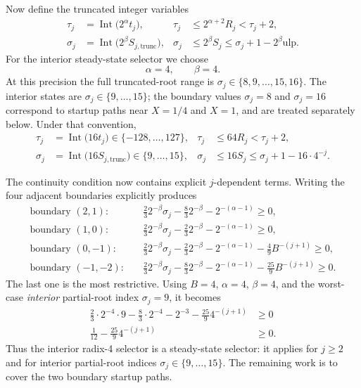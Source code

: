 \documentclass[11pt]{article}
\DeclareMathOperator{\Int}{Int}
\newcommand{\ulp}{\mathrm{ulp}}
\numberwithin{equation}{section}
\begin{document}
Now define the truncated integer variables
\begin{align}
  \label{eq:sqrt:radix4_tau_def}
  \tau_j &= \Int\bigl(2^{\alpha}t_j\bigr),
  &
  \tau_j &\le 2^{\alpha+2}R_j < \tau_j+2, \\
  \label{eq:sqrt:radix4_sigma_def}
  \sigma_j &= \Int\bigl(2^{\beta}S_{j,\text{trunc}}\bigr),
  &
  \sigma_j &\le 2^{\beta}S_j \le \sigma_j + 1 - 2^{\beta}\ulp.
\end{align}
For the interior steady-state selector we choose
\begin{equation}
  \label{eq:sqrt:radix4_alpha_beta_choice}
  \alpha = 4,
  \qquad
  \beta = 4.
\end{equation}
At this precision the full truncated-root range is $\sigma_j \in \{8,9,\dotsc,15,16\}$.
The interior states are $\sigma_j \in \{9,\dotsc,15\}$; the boundary values $\sigma_j=8$ and
$\sigma_j=16$ correspond to startup paths near $X=1/4$ and $X=1$, and are treated separately below.
Under that convention,
\begin{align}
  \label{eq:sqrt:radix4_tau_val}
  \tau_j &= \Int\bigl(16t_j\bigr) \in \{-128,\dotsc,127\},
  &
  \tau_j &\le 64R_j < \tau_j+2, \\
  \label{eq:sqrt:radix4_sigma_val}
  \sigma_j &= \Int\bigl(16S_{j,\text{trunc}}\bigr) \in \{9,\dotsc,15\},
  &
  \sigma_j &\le 16S_j \le \sigma_j + 1 - 16\cdot 4^{-j}.
\end{align}

The continuity condition now contains explicit $j$-dependent terms.
Writing the four adjacent boundaries explicitly produces
\begin{align}
  \text{boundary }(2,1):
  &\quad
  \frac{2}{3}2^{-\beta}\sigma_j - \frac{8}{3}2^{-\beta} - 2^{-(\alpha-1)} \ge 0,
  \label{eq:sqrt:radix4_cont_21} \\
  \text{boundary }(1,0):
  &\quad
  \frac{2}{3}2^{-\beta}\sigma_j - \frac{2}{3}2^{-\beta} - 2^{-(\alpha-1)} \ge 0,
  \label{eq:sqrt:radix4_cont_10} \\
  \text{boundary }(0,-1):
  &\quad
  \frac{2}{3}2^{-\beta}\sigma_j - \frac{2}{3}2^{-\beta} - 2^{-(\alpha-1)} - \frac{4}{9}B^{-(j+1)} \ge 0,
  \label{eq:sqrt:radix4_cont_0m1} \\
  \text{boundary }(-1,-2):
  &\quad
  \frac{2}{3}2^{-\beta}\sigma_j - \frac{8}{3}2^{-\beta} - 2^{-(\alpha-1)} - \frac{25}{9}B^{-(j+1)} \ge 0.
  \label{eq:sqrt:radix4_cont_m1m2}
\end{align}
The last one is the most restrictive.
Using $B=4$, $\alpha=4$, $\beta=4$, and the worst-case \emph{interior} partial-root index
$\sigma_j=9$, it becomes
\begin{align}
  \frac{2}{3}\cdot 2^{-4}\cdot 9 - \frac{8}{3}\cdot 2^{-4} - 2^{-3} - \frac{25}{9}4^{-(j+1)} &\ge 0 \nonumber \\
  \frac{1}{12} - \frac{25}{9}4^{-(j+1)} &\ge 0.
  \label{eq:sqrt:radix4_startup_restriction}
\end{align}
Thus the interior radix-4 selector is a steady-state selector: it applies for $j\ge 2$ and for
interior partial-root indices $\sigma_j \in \{9,\dotsc,15\}$.
The remaining work is to cover the two boundary startup paths.
\end{document}
